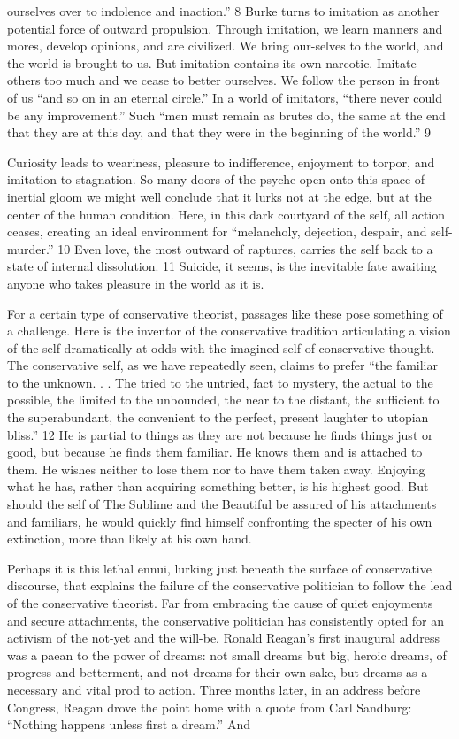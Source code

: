 ourselves over to indolence and inaction.” {\color{blue} 8 } Burke turns to imitation as another potential force of outward propulsion. Through imitation, we learn manners and mores, develop opinions, and are civilized. We bring our-selves to the world, and the world is brought to us. But imitation contains its own narcotic. Imitate others too much and we cease to better ourselves. We follow the person in front of us “and so on in an eternal circle.” In a world of imitators, “there never could be any improvement.” Such “men must remain as brutes do, the same at the end that they are at this day, and that they were in the beginning of the world.” {\color{blue} 9 } {\par} Curiosity leads to weariness, pleasure to indifference, enjoyment to torpor, and imitation to stagnation. So many doors of the psyche open onto this space of inertial gloom we might well conclude that it lurks not at the edge, but at the center of the human condition. Here, in this dark courtyard of the self, all action ceases, creating an ideal environment for “melancholy, dejection, despair, and self-murder.” {\color{blue} 10 } Even love, the most outward of raptures, carries the self back to a state of internal dissolution. {\color{blue} 11 } Suicide, it seems, is the inevitable fate awaiting anyone who takes pleasure in the world as it is.{\par} For a certain type of conservative theorist, passages like these pose something of a challenge. Here is the inventor of the conservative tradition articulating a vision of the self dramatically at odds with the imagined self of conservative thought. The conservative self, as we have repeatedly seen, claims to prefer “the familiar to the unknown. . . The tried to the untried, fact to mystery, the actual to the possible, the limited to the unbounded, the near to the distant, the sufficient to the superabundant, the convenient to the perfect, present laughter to utopian bliss.” {\color{blue} 12 } He is partial to things as they are not because he finds things just or good, but because he finds them familiar. He knows them and is attached to them. He wishes neither to lose them nor to have them taken away. Enjoying what he has, rather than acquiring something better, is his highest good. But should the self of The Sublime and the Beautiful be assured of his attachments and familiars, he would quickly find himself confronting the specter of his own extinction, more than likely at his own hand.{\par} Perhaps it is this lethal ennui, lurking just beneath the surface of conservative discourse, that explains the failure of the conservative politician to follow the lead of the conservative theorist. Far from embracing the cause of quiet enjoyments and secure attachments, the conservative politician has consistently opted for an activism of the not-yet and the will-be. Ronald Reagan’s first inaugural address was a paean to the power of dreams: not small dreams but big, heroic dreams, of progress and betterment, and not dreams for their own sake, but dreams as a necessary and vital prod to action. Three months later, in an address before Congress, Reagan drove the point home with a quote from Carl Sandburg: “Nothing happens unless first a dream.” And 